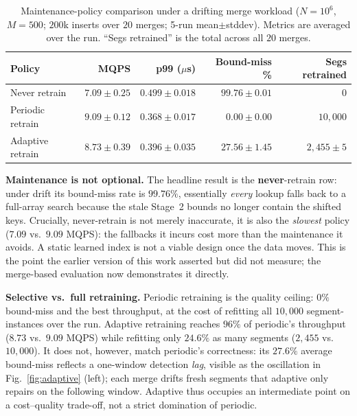 \documentclass[sigconf, nonacm]{acmart}
\begin{document}
\begin{table}[t]
\centering
\caption{Maintenance-policy comparison under a drifting merge workload ($N{=}10^6$, $M{=}500$; $200$k inserts over $20$ merges; 5-run mean$\pm$stddev). Metrics are averaged over the run. ``Segs retrained'' is the total across all $20$ merges.}
\label{tab:adaptive}
\begin{tabular}{lrrrr}
\toprule
\textbf{Policy} & \textbf{MQPS} & \textbf{p99 ($\mu$s)} & \textbf{Bound-miss \%} & \textbf{Segs retrained} \\
\midrule
Never retrain    & $7.09 \pm 0.25$ & $0.499 \pm 0.018$ & $99.76 \pm 0.01$ & $0$ \\
Periodic retrain & $\mathbf{9.09 \pm 0.12}$ & $\mathbf{0.368 \pm 0.017}$ & $\mathbf{0.00 \pm 0.00}$ & $10{,}000$ \\
Adaptive retrain & $8.73 \pm 0.39$ & $0.396 \pm 0.035$ & $27.56 \pm 1.45$ & $2{,}455 \pm 5$ \\
\bottomrule
\end{tabular}
\end{table}

\noindent\textbf{Maintenance is not optional.} The headline result is the \textbf{never}-retrain row: under drift its bound-miss rate is $99.76\%$, essentially \textit{every} lookup falls back to a full-array search because the stale Stage~2 bounds no longer contain the shifted keys. Crucially, never-retrain is not merely inaccurate, it is also the \textit{slowest} policy ($7.09$ vs.\ $9.09$ MQPS): the fallbacks it incurs cost more than the maintenance it avoids. A static learned index is not a viable design once the data moves. This is the point the earlier version of this work asserted but did not measure; the merge-based evaluation now demonstrates it directly.

\noindent\textbf{Selective vs.\ full retraining.} Periodic retraining is the quality ceiling: $0\%$ bound-miss and the best throughput, at the cost of refitting all $10{,}000$ segment-instances over the run. Adaptive retraining reaches $96\%$ of periodic's throughput ($8.73$ vs.\ $9.09$ MQPS) while refitting only $24.6\%$ as many segments ($2{,}455$ vs.\ $10{,}000$). It does not, however, match periodic's correctness: its $27.6\%$ average bound-miss reflects a one-window detection \textit{lag}, visible as the oscillation in Fig.~\ref{fig:adaptive} (left); each merge drifts fresh segments that adaptive only repairs on the following window. Adaptive thus occupies an intermediate point on a cost--quality trade-off, not a strict domination of periodic.
\end{document}
